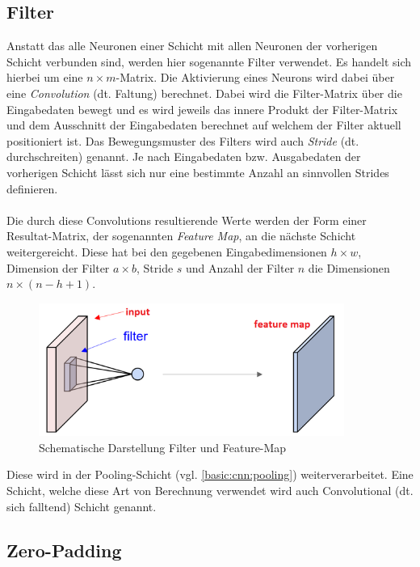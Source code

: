 \subsection{Filter}
\label{basic:cnn:filter}
Anstatt das alle Neuronen einer Schicht mit allen Neuronen der vorherigen Schicht verbunden sind, werden hier sogenannte Filter verwendet. Es handelt sich hierbei um eine $n\times m$-Matrix. Die Aktivierung eines Neurons wird dabei über eine \emph{Convolution} (dt. Faltung) berechnet. Dabei wird die Filter-Matrix über die Eingabedaten bewegt und es wird jeweils das innere Produkt der Filter-Matrix und dem Ausschnitt der Eingabedaten berechnet auf welchem der Filter aktuell positioniert ist. Das Bewegungsmuster des Filters wird auch \emph{Stride} (dt. durchschreiten) genannt. Je nach Eingabedaten bzw. Ausgabedaten der vorherigen Schicht lässt sich nur eine bestimmte Anzahl an sinnvollen Strides definieren.\\\\Die durch diese Convolutions resultierende Werte werden der Form einer Resultat-Matrix, der sogenannten \emph{Feature Map}, an die nächste Schicht weitergereicht. Diese hat bei den gegebenen Eingabedimensionen $h\times w$, Dimension der Filter $a\times b$, Stride $s$ und Anzahl der Filter $n$ die Dimensionen $n\times (n-h+1)$.\\

\begin{figure}[h]
	\centering
	\includegraphics[width=10cm]{img/filter_feature_map}
	\caption{Schematische Darstellung Filter und Feature-Map}
\end{figure}

Diese wird in der Pooling-Schicht (vgl. \ref{basic:cnn:pooling}) weiterverarbeitet. Eine Schicht, welche diese Art von Berechnung verwendet wird auch Convolutional (dt. sich falltend) Schicht genannt.
\subsection{Zero-Padding}
\blindtext
